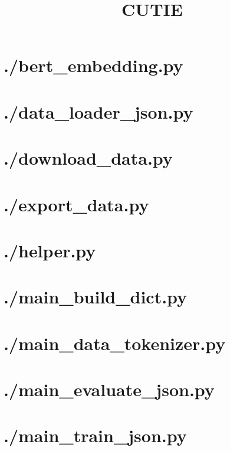 \documentclass{article}
\title{CUTIE}
\begin{document}
\maketitle
\label{toc}
\tableofcontents
\newpage
    \section{./bert\_embedding.py}
    
    \section{./data\_loader\_json.py}
    
    \section{./download\_data.py}
    
    \section{./export\_data.py}
    
    \section{./helper.py}
    
    \section{./main\_build\_dict.py}
    
    \section{./main\_data\_tokenizer.py}
    
    \section{./main\_evaluate\_json.py}
    
    \section{./main\_train\_json.py}
    
\end{document}
